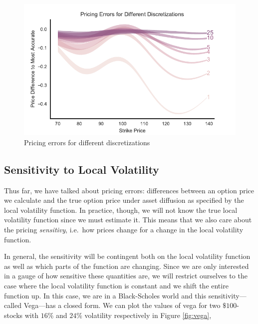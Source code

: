 \documentclass[11pt]{article}
\numberwithin{equation}{section}
\begin{document}
\begin{figure}[h!]
\centering
\includegraphics{figs/discretizationK.pdf}
\caption{Pricing errors for different discretizations}
\label{fig:discretizationK}
\end{figure}


\subsection{Sensitivity to Local Volatility}

Thus far, we have talked about pricing errors: differences between an option
price we calculate and the true option price under asset diffusion as specified
by the local volatility function. In practice, though, we will not know the true
local volatility function since we must estimate it. This means that we also
care about the pricing \emph{sensitivy}, i.e.\ how prices change for a change in
the local volatility function.

In general, the sensitivity will be contingent both on the local volatility
function as well as which parts of the function are changing. Since we are only
interested in a gauge of how sensitive these quantities are, we will restrict
ourselves to the case where the local volatility function is constant and we
shift the entire function up. In this case, we are in a Black-Scholes world and
this sensitivity---called Vega---has a closed form. We can plot the values of
vega for two $\$100$-stocks with $16\%$ and $24\%$ volatility respectively in
Figure \ref{fig:vega},
\end{document}
